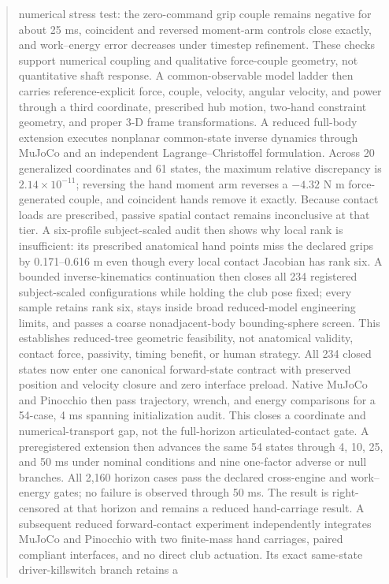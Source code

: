 \documentclass[
  letterpaper,
]{report}
\begin{document}
\begin{abstract}
numerical stress test: the zero-command grip couple remains negative for
about 25 ms, coincident and reversed moment-arm controls close exactly,
and work--energy error decreases under timestep refinement. These checks
support numerical coupling and qualitative force-couple geometry, not
quantitative shaft response. A common-observable model ladder then
carries reference-explicit force, couple, velocity, angular velocity,
and power through a third coordinate, prescribed hub motion, two-hand
constraint geometry, and proper 3-D frame transformations. A reduced
full-body extension executes nonplanar common-state inverse dynamics
through MuJoCo and an independent Lagrange--Christoffel formulation.
Across 20 generalized coordinates and 61 states, the maximum relative
discrepancy is \(2.14\times10^{-11}\); reversing the hand moment arm
reverses a \(-4.32\) N m force-generated couple, and coincident hands
remove it exactly. Because contact loads are prescribed, passive spatial
contact remains inconclusive at that tier. A six-profile subject-scaled
audit then shows why local rank is insufficient: its prescribed
anatomical hand points miss the declared grips by 0.171--0.616 m even
though every local contact Jacobian has rank six. A bounded
inverse-kinematics continuation then closes all 234 registered
subject-scaled configurations while holding the club pose fixed; every
sample retains rank six, stays inside broad reduced-model engineering
limits, and passes a coarse nonadjacent-body bounding-sphere screen.
This establishes reduced-tree geometric feasibility, not anatomical
validity, contact force, passivity, timing benefit, or human strategy.
All 234 closed states now enter one canonical forward-state contract
with preserved position and velocity closure and zero interface preload.
Native MuJoCo and Pinocchio then pass trajectory, wrench, and energy
comparisons for a 54-case, 4 ms spanning initialization audit. This
closes a coordinate and numerical-transport gap, not the full-horizon
articulated-contact gate. A preregistered extension then advances the
same 54 states through 4, 10, 25, and 50 ms under nominal conditions and
nine one-factor adverse or null branches. All 2,160 horizon cases pass
the declared cross-engine and work--energy gates; no failure is observed
through 50 ms. The result is right-censored at that horizon and remains
a reduced hand-carriage result. A subsequent reduced forward-contact
experiment independently integrates MuJoCo and Pinocchio with two
finite-mass hand carriages, paired compliant interfaces, and no direct
club actuation. Its exact same-state driver-killswitch branch retains a

\end{abstract}
\end{document}
